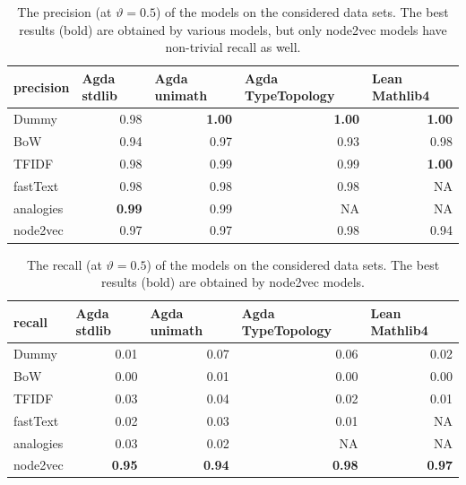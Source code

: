 \documentclass{article}
\begin{document}
\begin{table}[htb!]
  \centering
  \caption{The precision (at $\vartheta = 0.5$) of the models on the considered data sets. The best results (bold) are obtained by various models, but only node2vec models have non-trivial recall as well.}
    \begin{tabular}{l|rrrr}
    precision & \multicolumn{1}{l}{Agda stdlib} & \multicolumn{1}{l}{Agda unimath} & \multicolumn{1}{l}{Agda TypeTopology} & \multicolumn{1}{l}{Lean Mathlib4} \\
    \midrule
    Dummy & 0.98  &\textbf{ 1.00}  &\textbf{ 1.00}  & \textbf{1.00} \\
    BoW   & 0.94  & 0.97  & 0.93  & 0.98 \\
    TFIDF & 0.98  & 0.99  & 0.99  & \textbf{1.00} \\
    fastText & 0.98  & 0.98  & 0.98  & NA \\
    analogies & \textbf{0.99}  & 0.99  & NA    & NA \\
    node2vec & 0.97  & 0.97  & 0.98  & 0.94 \\
    \end{tabular}%
  \label{tab:precision}%
\end{table}%

\begin{table}[htb!]
  \centering
  \caption{The recall (at $\vartheta = 0.5$) of the models on the considered data sets. The best results (bold) are obtained by node2vec models.}
    \begin{tabular}{l|rrrr}
    recall & \multicolumn{1}{l}{Agda stdlib} & \multicolumn{1}{l}{Agda unimath} & \multicolumn{1}{l}{Agda TypeTopology} & \multicolumn{1}{l}{Lean Mathlib4} \\
    \midrule
    Dummy & 0.01  & 0.07  & 0.06  & 0.02 \\
    BoW   & 0.00  & 0.01  & 0.00  & 0.00 \\
    TFIDF & 0.03  & 0.04  & 0.02  & 0.01 \\
    fastText & 0.02  & 0.03  & 0.01  & NA \\
    analogies & 0.03  & 0.02  & NA    & NA \\
    node2vec & \textbf{0.95}  &\textbf{ 0.94 } &\textbf{ 0.98}  & \textbf{0.97} \\
    \end{tabular}%
  \label{tab:recall}%
\end{table}%
\end{document}

